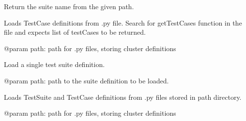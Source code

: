 \documentclass[letterpaper,10pt,english]{sphinxmanual}
\begin{document}

\begin{fulllineitems}
\label{ref-manual/XrdTest:XrdTest.TestUtils.extractSuiteName}
Return the suite name from the given path.

\end{fulllineitems}


\begin{fulllineitems}
\label{ref-manual/XrdTest:XrdTest.TestUtils.loadTestCasesDefs}
Loads TestCase definitions from .py file. Search for getTestCases function
in the file and expects list of testCases to be returned.

@param path: path for .py files, storing cluster definitions

\end{fulllineitems}


\begin{fulllineitems}
\label{ref-manual/XrdTest:XrdTest.TestUtils.loadTestSuiteDef}
Load a single test suite definition.

@param path: path to the suite definition to be loaded.

\end{fulllineitems}


\begin{fulllineitems}
\label{ref-manual/XrdTest:XrdTest.TestUtils.loadTestSuiteDefs}
Loads TestSuite and TestCase definitions from .py files
stored in path directory.

@param path: path for .py files, storing cluster definitions

\end{fulllineitems}


\begin{fulllineitems}
\label{ref-manual/XrdTest:XrdTest.TestUtils.readFile}
\end{fulllineitems}
\end{document}
